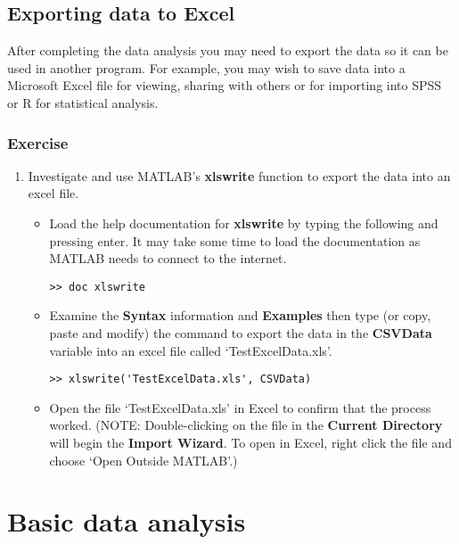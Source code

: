 \documentclass[12pt,a4paper]{article}
\begin{document}
\subsection{Exporting data to Excel}
After completing the data analysis you may need to export the data so it can be used in another program.  
For example, you may wish to save data into a Microsoft Excel file for viewing, sharing with others or for importing into SPSS or R for statistical analysis.

\subsubsection*{Exercise}
\begin{enumerate}
	\item Investigate and use MATLAB's \textbf{xlswrite} function to export the data into an excel file.
	\begin{itemize}
		\item Load the help documentation for \textbf{xlswrite} by typing the following and pressing enter.  It may take some time to load the documentation as MATLAB needs to connect to the internet.
		\begin{lstlisting}[style=Matlab-editor]		
>> doc xlswrite
		\end{lstlisting}
		\item Examine the \textbf{Syntax} information and \textbf{Examples} then type (or copy, paste and modify) the command to export the data in the \textbf{CSVData} variable into an excel file called `TestExcelData.xls'.
		\begin{lstlisting}[style=Matlab-editor]
>> xlswrite('TestExcelData.xls', CSVData)
		\end{lstlisting}	
		\item Open the file `TestExcelData.xls' in Excel to confirm that the process worked.  
		(NOTE: Double-clicking on the file in the \textbf{Current Directory} will begin the \textbf{Import Wizard}.  To open in Excel, right click the file and choose `Open Outside MATLAB'.)
	\end{itemize}
\end{enumerate}

\section{Basic data analysis}
\end{document}
